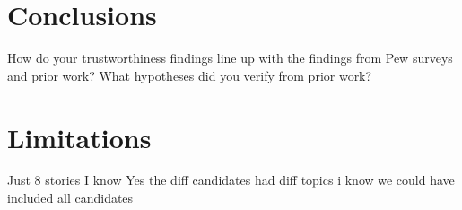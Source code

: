   


 

\section{Conclusions}

How do your trustworthiness findings line up with the findings from Pew surveys and prior work? What hypotheses did you verify from prior work?

\section{Limitations}

Just 8 stories I know
Yes the diff candidates had diff topics i know
we could have included all candidates
